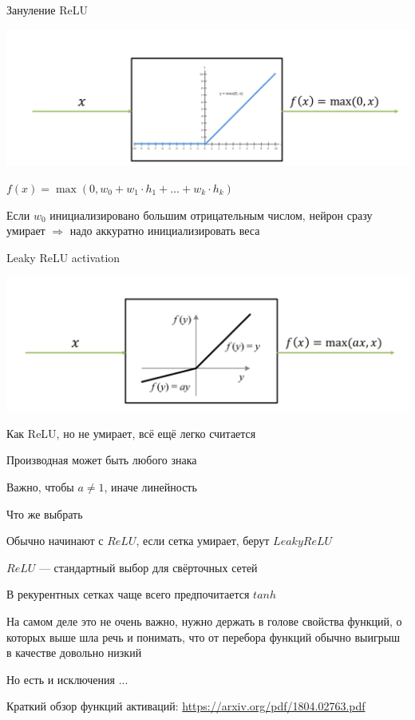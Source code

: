 \documentclass[notes,12pt, aspectratio=169]{beamer}
\newenvironment{wideitemize}{\itemize\addtolength{\itemsep}{10pt}}{\enditemize}
\begin{document}
\begin{frame}{Зануление ReLU}
\begin{center}
	\includegraphics[width=.7\linewidth]{relu_activation.png}
\end{center}

\begin{wideitemize}
	\item   $f(x) = \max(0, w_0 + w_1 \cdot h_1 + \ldots + w_k \cdot h_k)$
	
	\item  Если $w_0$ инициализировано большим отрицательным числом, нейрон сразу умирает $\Rightarrow$ надо аккуратно инициализировать веса
\end{wideitemize}
\end{frame}


\begin{frame}{Leaky ReLU activation}
\begin{center}
\includegraphics[width=.7\linewidth]{leaky_relu_activation.png}
\end{center}

\begin{itemize}
{ \color{green} 
\item Как ReLU, но не умирает, всё ещё легко считается
\item Производная может быть любого знака
\item Важно, чтобы $a \ne 1$, иначе линейность
} 
\end{itemize}
\end{frame}


\begin{frame}{Что же выбрать}
\begin{wideitemize}
	\item Обычно начинают с $ReLU$, если сетка умирает, берут $Leaky ReLU$
	\item $ReLU$ — стандартный выбор для свёрточных сетей 
	\item В рекурентных сетках чаще всего предпочитается $tanh$ 
	\item На самом деле это не очень важно, нужно держать в голове свойства функций, о которых выше шла речь и понимать, что от перебора функций обычно выигрыш в качестве довольно низкий 
	\item Но есть и исключения ...
\end{wideitemize}

\vfill %
\footnotesize
Краткий обзор функций активаций: {\color{blue}  \url{https://arxiv.org/pdf/1804.02763.pdf}}
\end{frame}
\end{document}
